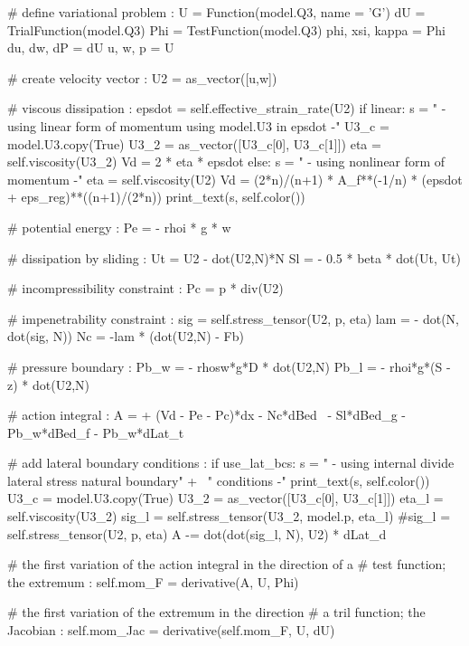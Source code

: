 \begin{python}[label=cslvr_plane_strain, caption={\CSLVR source code contained in the \texttt{MomentumDukowiczPlaneStrain} class.}]
# define variational problem :
U               = Function(model.Q3, name = 'G')
dU              = TrialFunction(model.Q3)
Phi             = TestFunction(model.Q3)
phi, xsi, kappa = Phi
du,  dw,  dP    = dU
u,   w,   p     = U

# create velocity vector :
U2     = as_vector([u,w])

# viscous dissipation :
epsdot  = self.effective_strain_rate(U2)
if linear:
  s  = "    - using linear form of momentum using model.U3 in epsdot -"
  U3_c = model.U3.copy(True)
  U3_2 = as_vector([U3_c[0], U3_c[1]])
  eta  = self.viscosity(U3_2)
  Vd   = 2 * eta * epsdot
else:
  s  = "    - using nonlinear form of momentum -"
  eta  = self.viscosity(U2)
  Vd   = (2*n)/(n+1) * A_f**(-1/n) * (epsdot + eps_reg)**((n+1)/(2*n))
print_text(s, self.color())

# potential energy :
Pe     = - rhoi * g * w

# dissipation by sliding :
Ut     = U2 - dot(U2,N)*N
Sl     = - 0.5 * beta * dot(Ut, Ut)

# incompressibility constraint :
Pc     = p * div(U2) 

# impenetrability constraint :
sig    = self.stress_tensor(U2, p, eta)
lam    = - dot(N, dot(sig, N))
Nc     = -lam * (dot(U2,N) - Fb)

# pressure boundary :
Pb_w   = - rhosw*g*D * dot(U2,N)
Pb_l   = - rhoi*g*(S - z) * dot(U2,N)

# action integral :
A      = + (Vd - Pe - Pc)*dx - Nc*dBed \
         - Sl*dBed_g - Pb_w*dBed_f - Pb_w*dLat_t

# add lateral boundary conditions :  
if use_lat_bcs:
  s = "    - using internal divide lateral stress natural boundary" + \
      " conditions -"
  print_text(s, self.color())
  U3_c     = model.U3.copy(True)
  U3_2     = as_vector([U3_c[0], U3_c[1]])
  eta_l    = self.viscosity(U3_2)
  sig_l    = self.stress_tensor(U3_2, model.p, eta_l)
  #sig_l   = self.stress_tensor(U2, p, eta)
  A -= dot(dot(sig_l, N), U2) * dLat_d

# the first variation of the action integral in the direction of a 
# test function; the extremum :
self.mom_F = derivative(A, U, Phi)

# the first variation of the extremum in the direction 
# a tril function; the Jacobian :
self.mom_Jac = derivative(self.mom_F, U, dU)
  

\end{python}
